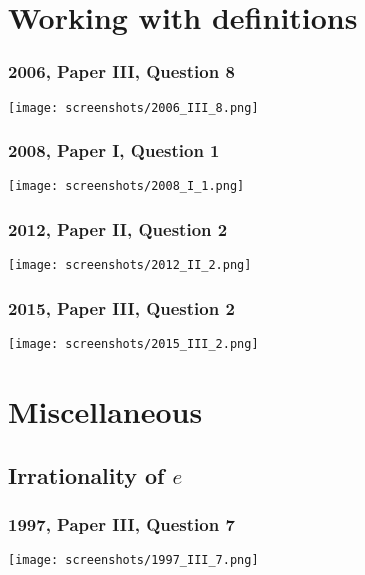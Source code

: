 \documentclass[a4paper,12pt]{article}
\begin{document}
\section{Working with definitions}

\subsubsection{2006, Paper III, Question 8}
\begin{center}
 \texttt{[image: screenshots/2006\_III\_8.png]}
\end{center}

\subsubsection{2008, Paper I, Question 1}
\begin{center}
 \texttt{[image: screenshots/2008\_I\_1.png]}
\end{center}

\subsubsection{2012, Paper II, Question 2}
\begin{center}
 \texttt{[image: screenshots/2012\_II\_2.png]}
\end{center}

\subsubsection{2015, Paper III, Question 2}
\begin{center}
 \texttt{[image: screenshots/2015\_III\_2.png]}
\end{center}

\section{Miscellaneous}

\subsection{Irrationality of \(e\)}

\subsubsection{1997, Paper III, Question 7}
\begin{center}
 \texttt{[image: screenshots/1997\_III\_7.png]}
\end{center}
\end{document}
